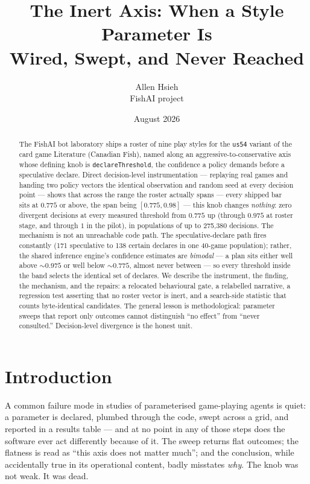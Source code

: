 \documentclass[11pt]{article}
\title{\textbf{The Inert Axis: When a Style Parameter Is\\ Wired, Swept, and Never Reached}}
\author{Allen Hsieh\\[2pt] {\small FishAI project}}
\date{August 2026}
\newcommand{\code}[1]{\texttt{#1}}
\begin{document}
\maketitle

\begin{abstract}
\noindent
The FishAI bot laboratory ships a roster of nine play styles for the \code{us54} variant of the
card game Literature (Canadian Fish), named along an aggressive-to-conservative axis whose defining knob is
\code{declareThreshold}, the confidence a policy demands before a speculative declare. Direct
decision-level instrumentation --- replaying real games and handing two policy vectors the
identical observation and random seed at every decision point --- shows that across the range the
roster actually spans --- every shipped bar sits at $0.775$ or above, the span being
$[0.775, 0.98]$ --- this knob changes \emph{nothing}: zero divergent decisions at every measured
threshold from $0.775$ up (through $0.975$ at roster stage, and through $1$ in the pilot), in
populations of up to 275{,}380 decisions. The mechanism is not an unreachable code
path. The speculative-declare path fires constantly (171 speculative to 138 certain declares in
one 40-game population); rather, the shared inference engine's confidence estimates are
\emph{bimodal} --- a plan sits either well above ${\sim}0.975$ or well below ${\sim}0.775$, almost
never between --- so every threshold inside the band selects the identical set of declares. We
describe the instrument, the finding, the mechanism, and the repairs: a relocated behavioural
gate, a relabelled narrative, a regression test asserting that no roster vector is inert, and a
search-side statistic that counts byte-identical candidates. The general lesson is
methodological: parameter sweeps that report only outcomes cannot distinguish ``no effect'' from
``never consulted.'' Decision-level divergence is the honest unit.
\end{abstract}

\section{Introduction}
\label{sec:intro}

A common failure mode in studies of parameterised game-playing agents is quiet: a parameter is
declared, plumbed through the code, swept across a grid, and reported in a results table --- and at
no point in any of those steps does the software ever act differently because of it. The sweep
returns flat outcomes; the flatness is read as ``this axis does not matter much''; and the
conclusion, while accidentally true in its operational content, badly misstates \emph{why}. The
knob was not weak. It was dead.
\end{document}
